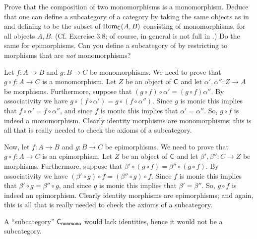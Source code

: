 \begin{exercise}
	Prove that the composition of two monomorphisms is a monomorphism. Deduce that one can define a subcategory  of a category  by taking the same objects as in  and defining  to be the subset of \(\Hom_{\text{\serif{C}}}(A, B)\) consisting of monomorphisms, for all objects \(A, B\). (Cf. Exercise 3.8; of course, in general  is not full in .) Do the same for epimorphisms. Can you define a subcategory  of  by restricting to morphisms that are \textit{not} monomorphisms?
\end{exercise}
\begin{solution}
	Let $f\colon A \to B$ and $g\colon B \to C$ be monomorphisms. We need to prove that $g\circ f \colon A \to C$ is a monomorphism. Let $Z$ be an object of $\textsf{C}$ and let $\alpha',\alpha''\colon Z \to A$ be morphisms. Furthermore, suppose that $(g\circ f)\circ \alpha' = (g\circ f)\alpha''$. By associativity we have $g\circ (f\circ \alpha') = g\circ (f\circ \alpha'')$. Since $g$ is monic this implies that $f\circ \alpha' = f\circ \alpha''$, and since $f$ is monic this implies that $\alpha' = \alpha''$. So, $g\circ f$ is indeed a monomorphism. Clearly identity morphisms are monomorphisms; this is all that is really needed to check the axioms of a subcategory. 
	
	Now, let $f\colon A \to B$ and $g\colon B \to C$ be epimorphisms. We need to prove that $g\circ f \colon A \to C$ is an epimorphism. Let $Z$ be an object of $\textsf{C}$ and let $\beta',\beta''\colon C \to Z$ be morphisms. Furthermore, suppose that $\beta'\circ (g\circ f) =\beta'' \circ (g\circ f)$. By associativity we have $(\beta'\circ g)\circ f =(\beta'' \circ g)\circ f$. Since $f$ is monic this implies that $\beta'\circ g = \beta'' \circ g$, and since $g$ is monic this implies that $\beta' = \beta''$. So, $g\circ f$ is indeed an epimorphism. Clearly identity morphisms are epimorphisms; and again, this is all that is really needed to check the axioms of a subcategory. 
	
	A ``subcategory'' $\textsf{C}_{\textsf{nonmono}}$ would lack identities, hence it would not be a subcategory.
\end{solution}

